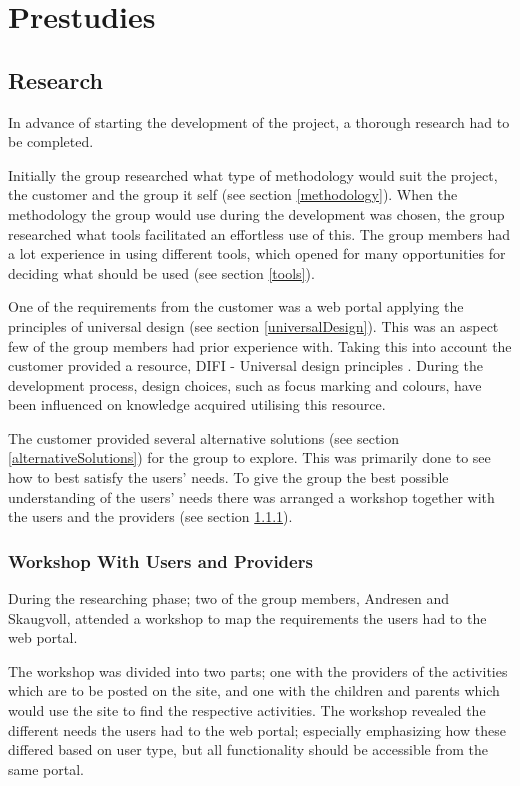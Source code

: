 
\chapter{Prestudies}

\section{Research}
In advance of starting the development of the project, a thorough research had to be completed.

Initially the group researched what type of methodology would suit the project, the customer and the group it self (see section \ref{methodology}). When the methodology the group would use during the development was chosen, the group researched what tools facilitated an effortless use of this. The group members had a lot experience in using different tools, which opened for many opportunities for deciding what should be used (see section \ref{tools}).

One of the requirements from the customer was a web portal applying the principles of universal design (see section \ref{universalDesign}). This was an aspect few of the group members had prior experience with. Taking this into account the customer provided a resource, DIFI - Universal design principles \cite{Difi}. During the development process, design choices, such as focus marking and colours, have been influenced on knowledge acquired utilising this resource. 

The customer provided several alternative solutions (see section \ref{alternativeSolutions}) for the group to explore. This was primarily done to see how to best satisfy the users' needs. To give the group the best possible understanding of the users' needs there was arranged a workshop together with the users and the providers (see section \ref{WorkshopUserAndProviders}). 


\subsection{Workshop With Users and Providers}
\label{WorkshopUserAndProviders}
During the researching phase; two of the group members, Andresen and Skaugvoll, attended a workshop to map the requirements the users had to the web portal. 

The workshop was divided into two parts; one with the providers of the activities which are to be posted on the site, and one with the children and parents which would use the site to find the respective activities. The workshop revealed the different needs the users had to the web portal; especially emphasizing how these differed based on user type, but all functionality should be accessible from the same portal. 

